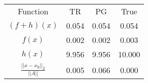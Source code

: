 \begin{tabular}{| c |c |c |c |}
    \hline
    \rowcolor[gray]{0.9}
\multicolumn{4}{|c|}{Minima} \\ \hline Function & TR & PG & True \\
    \hline
  \rowcolor[gray]{0.7}
    $ (f + h)(x) $ & 0.054 & 0.054 & 0.054 \\
  \hline
  \rowcolor[gray]{0.8}
    $ f(x) $ & 0.002 & 0.002 & 0.003 \\
  \hline
  \rowcolor[gray]{0.7}
    $ h(x) $ & 9.956 & 9.956 & 10.000 \\
  \hline
  \rowcolor[gray]{0.8}
    $ \frac{||x - x_0||_2}{||A||} $ & 0.005 & 0.066 & 0.000 \\
  \hline
\end{tabular}
